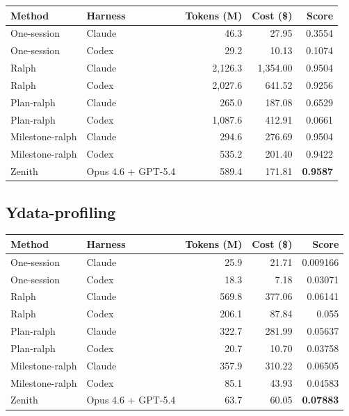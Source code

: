 \documentclass[11pt,a4paper]{article}
\newcommand{\code}[1]{#1}
\begin{document}
\noindent\begin{tabular}{@{}llrrr@{}}
\toprule
\rowcolor{tablehead}\textbf{\color{white}Method} & \textbf{\color{white}Harness} & \textbf{\color{white}Tokens (M)} & \textbf{\color{white}Cost (\$)} & \textbf{\color{white}Score} \\
\midrule
\code{One-session}    & Claude              & 46.3   & 27.95      & 0.3554 \\
\rowcolor{tableband}
\code{One-session}    & Codex               & 29.2   & 10.13      & 0.1074 \\
\code{Ralph}          & Claude              & 2{,}126.3 & 1{,}354.00 & 0.9504 \\
\rowcolor{tableband}
\code{Ralph}          & Codex               & 2{,}027.6 & 641.52     & 0.9256 \\
\code{Plan-ralph}     & Claude              & 265.0  & 187.08     & 0.6529 \\
\rowcolor{tableband}
\code{Plan-ralph}     & Codex               & 1{,}087.6 & 412.91     & 0.0661 \\
\code{Milestone-ralph}& Claude              & 294.6  & 276.69     & 0.9504 \\
\rowcolor{tableband}
\code{Milestone-ralph}& Codex               & 535.2  & 201.40     & 0.9422 \\
\code{Zenith}         & Opus 4.6 + GPT-5.4  & 589.4  & 171.81     & \textbf{0.9587} \\
\bottomrule
\end{tabular}

\subsection*{Ydata-profiling}

\noindent\begin{tabular}{@{}llrrr@{}}
\toprule
\rowcolor{tablehead}\textbf{\color{white}Method} & \textbf{\color{white}Harness} & \textbf{\color{white}Tokens (M)} & \textbf{\color{white}Cost (\$)} & \textbf{\color{white}Score} \\
\midrule
\code{One-session}    & Claude              & 25.9 & 21.71  & 0.009166 \\
\rowcolor{tableband}
\code{One-session}    & Codex               & 18.3 & 7.18   & 0.03071 \\
\code{Ralph}          & Claude              & 569.8 & 377.06 & 0.06141 \\
\rowcolor{tableband}
\code{Ralph}          & Codex               & 206.1 & 87.84  & 0.055 \\
\code{Plan-ralph}     & Claude              & 322.7 & 281.99 & 0.05637 \\
\rowcolor{tableband}
\code{Plan-ralph}     & Codex               & 20.7  & 10.70  & 0.03758 \\
\code{Milestone-ralph}& Claude              & 357.9 & 310.22 & 0.06505 \\
\rowcolor{tableband}
\code{Milestone-ralph}& Codex               & 85.1  & 43.93  & 0.04583 \\
\code{Zenith}         & Opus 4.6 + GPT-5.4  & 63.7  & 60.05  & \textbf{0.07883} \\
\bottomrule
\end{tabular}
\end{document}
